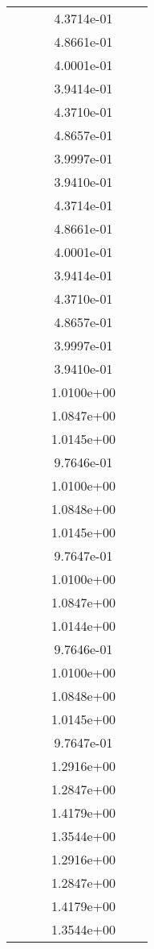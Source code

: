 \begin{xltabular}{\textwidth}{r|rS[table-format=1.3e+2]S[table-format=1.4e+2]S[table-format=1.4e+2]S[table-format=-1.5]}
&  &  & 4.3714e-01 & & \\
&  &  & 4.8661e-01 & & \\
&  &  & 4.0001e-01 & & \\
&  &  & 3.9414e-01 & & \\
&  &  & 4.3710e-01 & & \\
&  &  & 4.8657e-01 & & \\
&  &  & 3.9997e-01 & & \\
&  &  & 3.9410e-01 & & \\
&  &  & 4.3714e-01 & & \\
&  &  & 4.8661e-01 & & \\
&  &  & 4.0001e-01 & & \\
&  &  & 3.9414e-01 & & \\
&  &  & 4.3710e-01 & & \\
&  &  & 4.8657e-01 & & \\
&  &  & 3.9997e-01 & & \\
&  &  & 3.9410e-01 & & \\
&  &  & 1.0100e+00 & & \\
&  &  & 1.0847e+00 & & \\
&  &  & 1.0145e+00 & & \\
&  &  & 9.7646e-01 & & \\
&  &  & 1.0100e+00 & & \\
&  &  & 1.0848e+00 & & \\
&  &  & 1.0145e+00 & & \\
&  &  & 9.7647e-01 & & \\
&  &  & 1.0100e+00 & & \\
&  &  & 1.0847e+00 & & \\
&  &  & 1.0144e+00 & & \\
&  &  & 9.7646e-01 & & \\
&  &  & 1.0100e+00 & & \\
&  &  & 1.0848e+00 & & \\
&  &  & 1.0145e+00 & & \\
&  &  & 9.7647e-01 & & \\
&  &  & 1.2916e+00 & & \\
&  &  & 1.2847e+00 & & \\
&  &  & 1.4179e+00 & & \\
&  &  & 1.3544e+00 & & \\
&  &  & 1.2916e+00 & & \\
&  &  & 1.2847e+00 & & \\
&  &  & 1.4179e+00 & & \\
&  &  & 1.3544e+00 & & \\

\end{xltabular}
